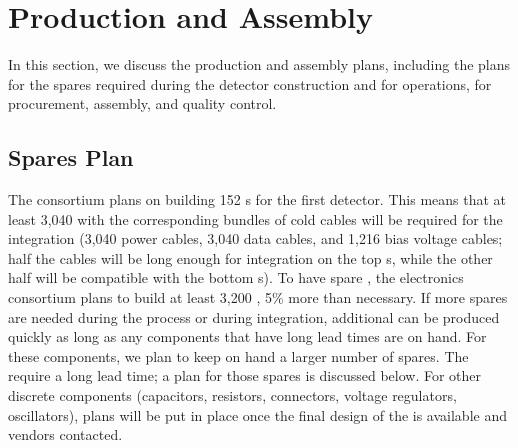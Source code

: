 \section{Production and Assembly}
\label{sec:fdsp-tpcelec-production}

In this section, we discuss the production and assembly plans,
including the plans for the spares required during the detector
construction and for operations, for
procurement, assembly, and quality control.


\subsection{Spares Plan}
\label{sec:fdsp-tpcelec-production-spares}

The  consortium plans on building 152 s
for the first  detector. This means that at least
3,040  with the corresponding bundles of cold
cables will be required for the integration (3,040 power cables, 3,040 data cables,
and 1,216 bias voltage cables; half the cables will be long enough for 
integration on the top s, while the other half will
be compatible with the bottom s). To have spare , the  electronics consortium plans to
build at least 3,200 , 5\% more than necessary. If more spares are needed during the
 process or during integration, additional 
 can be produced quickly as long as any components that have 
long lead times are on hand. For these components, we plan to keep on hand a
larger number of spares. The  require a long lead time; a plan for those spares is
discussed below. For other discrete components
(capacitors, resistors, connectors, voltage regulators, oscillators),
plans will be put in place once the final design of the 
is available and vendors contacted. %

